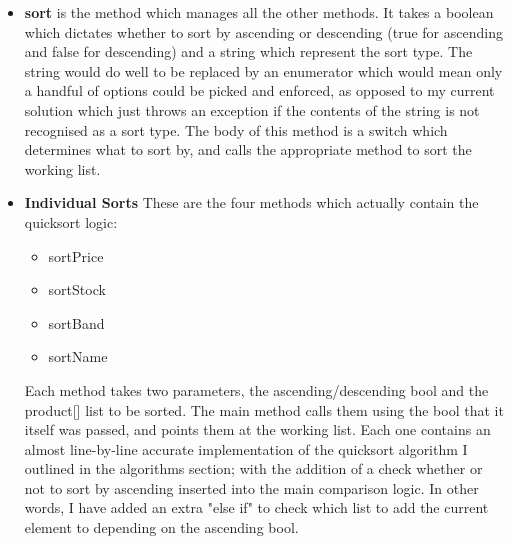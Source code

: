 ﻿\documentclass{article}
\begin{document}
    \begin{itemize}
        \item \textbf{sort} is the method which manages all the other methods.
        It takes a boolean which dictates whether to sort by ascending or descending (true for ascending and false for descending) and a string which represent the sort type.
        The string would do well to be replaced by an enumerator which would mean only a handful of options could be picked and enforced, as opposed to my current solution which just throws an exception if the contents of the string is not recognised as a sort type.
        The body of this method is a switch which determines what to sort by, and calls the appropriate method to sort the working list.
        \item \textbf{Individual Sorts} These are the four methods which actually contain the quicksort logic:
        \begin{itemize}
            \item sortPrice
            \item sortStock
            \item sortBand
            \item sortName
        \end{itemize}
        Each method takes two parameters, the ascending/descending bool and the product[] list to be sorted.
        The main method calls them using the bool that it itself was passed, and points them at the working list.
        Each one contains an almost line-by-line accurate implementation of the quicksort algorithm I outlined in the algorithms section; with the addition of a check whether or not to sort by ascending inserted into the main comparison logic.
        In other words, I have added an extra "else if" to check which list to add the current element to depending on the ascending bool.
    \end{itemize}
\end{document}
